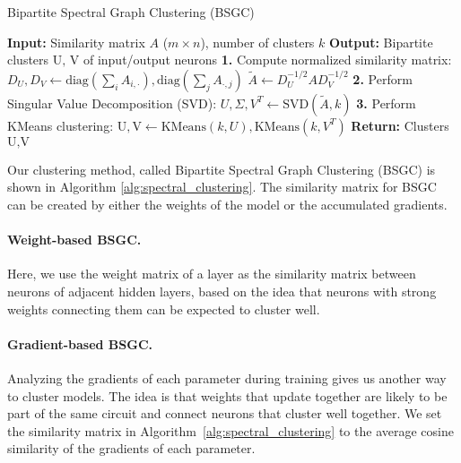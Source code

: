 \begin{algorithm}[t]
   \caption{Bipartite Spectral Graph Clustering (BSGC)}
   \label{alg:spectral_clustering}
   \begin{algorithmic}[1]
      \STATE \textbf{Input:} Similarity matrix $A$ ($m \times n$), number of clusters $k$
      \STATE \textbf{Output:} Bipartite clusters $\text{U, V}$ of input/output neurons
      \STATE \textbf{1.} Compute normalized similarity matrix:
      \STATE \quad $D_U, D_V \gets \text{diag}\left(\sum_i A_{i, \cdot}\right), \text{diag}\left(\sum_j A_{\cdot, j}\right)$
      \STATE \quad $\tilde{A} \gets D_U^{-1/2} A D_V^{-1/2}$
      \STATE \textbf{2.} Perform Singular Value Decomposition (SVD):
      \STATE \quad $U, \Sigma, V^T \gets \text{SVD}(\tilde{A}, k)$
      \STATE \textbf{3.} Perform KMeans clustering:
      \STATE \quad $\text{U}, \text{V} \gets \text{KMeans}(k, U), \text{KMeans}(k, V^T)$
      \STATE \textbf{Return:} Clusters $\text{U}, \text{V}$
   \end{algorithmic}
\end{algorithm}

Our clustering method, called Bipartite Spectral Graph Clustering (BSGC) is shown in Algorithm \ref{alg:spectral_clustering}. The similarity matrix for BSGC can be created by either the weights of the model or the accumulated gradients.

\paragraph{Weight-based BSGC.}
\label{subsec:weight-bsgc}

Here, we use the weight matrix of a layer as the similarity matrix between neurons of adjacent hidden layers, based on the idea that neurons with strong weights connecting them can be expected to cluster well.


\paragraph{Gradient-based BSGC.}
\label{subsec:grads-bsgc}

Analyzing the gradients of each parameter during training gives us another way to cluster models. The idea is that weights that update together are likely to be part of the same circuit and connect neurons that cluster well together. We set the similarity matrix in Algorithm~\ref{alg:spectral_clustering} to the average cosine similarity of the gradients of each parameter.

